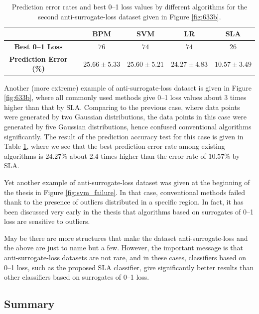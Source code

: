 \begin{table}[htbp!]
\centering
\begin{tabular}{|cc|  ccc|c|}
\hline\hline
 && {\bf BPM} & {\bf SVM} & {\bf LR} & {\bf SLA}\\  
\hline
{\bf Best 0--1 Loss} && 
$76$ & $74$ & $74$ & $26$ \\  
{\bf Prediction Error (\%)} && 
$25.66 \pm 5.33$ & $25.60 \pm 5.21$ & $24.27 \pm 4.83$ & $10.57 \pm 3.49$ \\  
\hline\hline
\end{tabular}
\caption{Prediction error rates and best 0--1 loss values by different algorithms for the second anti-surrogate-loss dataset given in Figure \ref{fig:633b}.} 
\label{tab:antirates2}
\end{table}

Another (more extreme) example of anti-surrogate-loss dataset is given in Figure \ref{fig:633b}, where all commonly used methods give 0--1 loss values about 3 times higher than that by SLA. Comparing to the previous case, where data points were generated by two Gaussian distributions, the data points in this case were generated by five Gaussian distributions, hence confused conventional algorithms significantly. The result of the prediction accuracy test for this case is given in Table \ref{tab:antirates2}, where we see that the best prediction error rate among existing algorithms is $24.27\%$ about 2.4 times higher than the error rate of $10.57\%$ by SLA.

Yet another example of anti-surrogate-loss dataset was given at the beginning of the thesis in Figure \ref{fig:svm_failure}. In that case, conventional methods failed thank to the presence of outliers distributed in a specific region. In fact, it has been discussed very early in the thesis that algorithms based on surrogates of 0--1 loss are sensitive to outliers. 

May be there are more structures that make the dataset anti-surrogate-loss and the above are just to name but a few. However, the important message is that anti-surrogate-loss datasets are not rare, and in these cases, classifiers based on 0--1 loss, such as the proposed SLA classifier, give significantly better results than other classifiers based on surrogates of 0--1 loss.


\subsection{Summary}
\label{sec:rc.summary}

